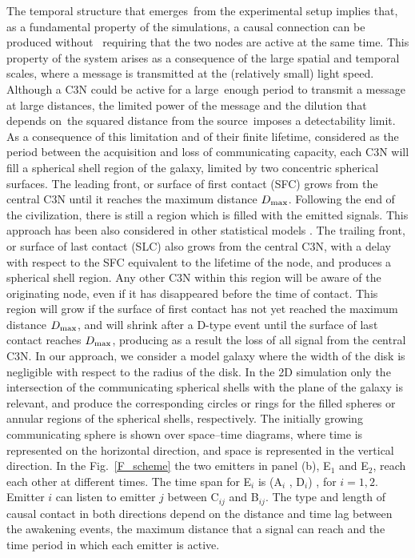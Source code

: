 \documentclass[crop]{CSLB}
\newcommand{\ceti}{C3N}
\begin{document}
The temporal structure that emerges from the experimental setup implies that,
as a fundamental property of the simulations, a causal connection can be
produced without  requiring that the two nodes are active at the same time.
%
This property of the system arises as a consequence of the large spatial and
temporal scales, where a message is transmitted at the (relatively small) light
speed.
%
Although a \ceti{} could be active for a large enough period to transmit a
message at large distances, the limited power of the message and the dilution
that depends on the squared distance from the source imposes a detectability
limit.
%
As a consequence of this limitation and of their finite lifetime, considered as
the period between the acquisition and loss of communicating capacity, each
\ceti{} will fill a spherical shell region of the galaxy, limited by two
concentric spherical surfaces.
%
The leading front, or surface of first contact (SFC) grows from the central
\ceti{} until it reaches the maximum distance $D_{\rm max}$.
%
Following the end of the civilization, there is still a region which is filled
with the emitted signals.
%
This approach has been also considered in other statistical models \citep[e.g.,
][]{smith_broadcasting_2009, grimaldi_signal_2017, Grimaldi2018}.
%
The trailing front, or surface of last contact (SLC) also grows from the
central \ceti{}, with a delay with respect to the SFC equivalent to the
lifetime of the node, and produces a spherical shell region.
%
Any other \ceti{} within this region will be aware of the originating node,
even if it has disappeared before the time of contact.
%
This region will grow if the surface of first contact has not yet reached the
maximum distance $D_{\rm max}$, and will shrink after a D-type event until the
surface of last contact reaches $D_{\rm max}$, producing as a result the loss
of all signal from the central \ceti{}.
%
In our approach, we consider a model galaxy where the width of the disk is
negligible with respect to the radius of the disk.
%
In the 2D simulation only the intersection of the communicating spherical
shells with the plane of the galaxy is relevant, and produce the corresponding
circles or rings for the filled spheres or annular regions of the spherical
shells, respectively.
%
The initially growing communicating sphere is shown over space--time diagrams,
where time is represented on the horizontal direction, and space is represented
in the vertical direction.
%
In the Fig.~\ref{F_scheme} the two emitters in panel (b), E$_1$ and E$_2$,
reach each other at different times.
%
The time span for E$_i$ is (A$_i$ , D$_i$) , for $i = {1, 2}$.
%
Emitter $i$ can listen to emitter $j$ between C$_{ij}$ and B$_{ij}$.
%
The type and length of causal contact in both directions depend on the distance
and time lag between the awakening events, the maximum distance that a signal
can reach and the time period in which each emitter is active.
\end{document}

